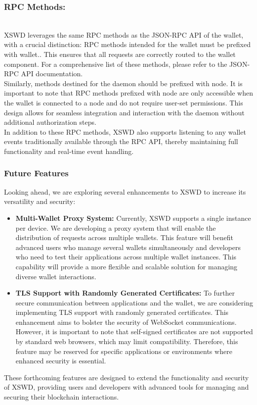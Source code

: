 \documentclass[10pt,a4paper,twocolumn]{article}
\begin{document}
\subsubsection{RPC Methods:}\\

XSWD leverages the same RPC methods as the JSON-RPC API of the wallet, with a crucial distinction: RPC methods intended for the wallet must be prefixed with wallet.. This ensures that all requests are correctly routed to the wallet component. For a comprehensive list of these methods, please refer to the JSON-RPC API documentation.\\

Similarly, methods destined for the daemon should be prefixed with node. It is important to note that RPC methods prefixed with node are only accessible when the wallet is connected to a node and do not require user-set permissions. This design allows for seamless integration and interaction with the daemon without additional authorization steps.\\

In addition to these RPC methods, XSWD also supports listening to any wallet events traditionally available through the RPC API, thereby maintaining full functionality and real-time event handling.

\subsubsection{Future Features}

Looking ahead, we are exploring several enhancements to XSWD to increase its versatility and security:\\

\begin{itemize}
\item \textbf{Multi-Wallet Proxy System:} Currently, XSWD supports a single instance per device. We are developing a proxy system that will enable the distribution of requests across multiple wallets. This feature will benefit advanced users who manage several wallets simultaneously and developers who need to test their applications across multiple wallet instances. This capability will provide a more flexible and scalable solution for managing diverse wallet interactions.

\item \textbf{TLS Support with Randomly Generated Certificates:} To further secure communication between applications and the wallet, we are considering implementing TLS support with randomly generated certificates. This enhancement aims to bolster the security of WebSocket communications. However, it is important to note that self-signed certificates are not supported by standard web browsers, which may limit compatibility. Therefore, this feature may be reserved for specific applications or environments where enhanced security is essential.\\
\end{itemize}
These forthcoming features are designed to extend the functionality and security of XSWD, providing users and developers with advanced tools for managing and securing their blockchain interactions.
\end{document}
